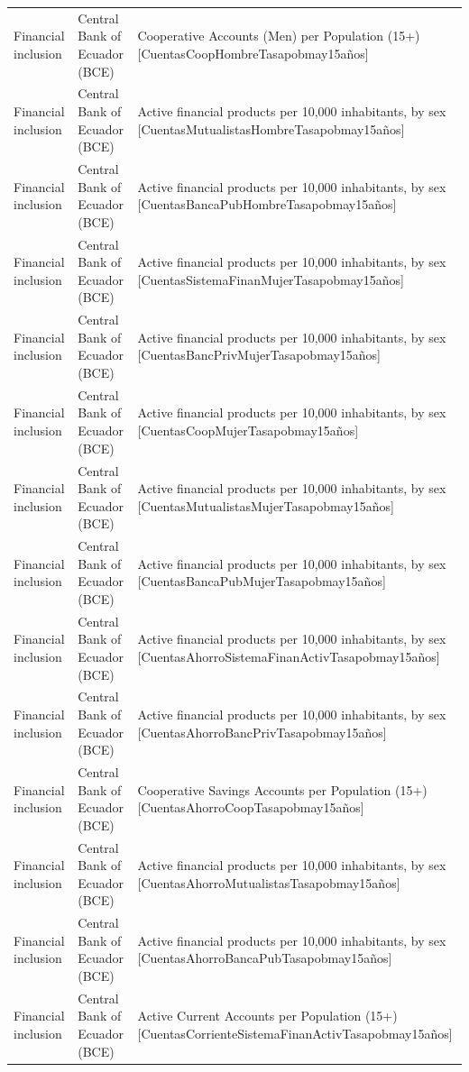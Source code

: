 \documentclass[10pt,a4paper]{article}
\begin{document}
\begin{longtable}{@{}>{\raggedright\arraybackslash}p{3.5cm}>{\raggedright\arraybackslash}p{5.6cm}>{\raggedright\arraybackslash}p{\dimexpr\textwidth-9.1cm-4\tabcolsep\relax}@{}}
Financial inclusion & Central Bank of Ecuador (BCE) & Cooperative Accounts (Men) per Population (15+) [CuentasCoopHombreTasapobmay15a\~{n}os]\\
Financial inclusion & Central Bank of Ecuador (BCE) & Active financial products per 10,000 inhabitants, by sex [CuentasMutualistasHombreTasapobmay15a\~{n}os]\\
Financial inclusion & Central Bank of Ecuador (BCE) & Active financial products per 10,000 inhabitants, by sex [CuentasBancaPubHombreTasapobmay15a\~{n}os]\\
Financial inclusion & Central Bank of Ecuador (BCE) & Active financial products per 10,000 inhabitants, by sex [CuentasSistemaFinanMujerTasapobmay15a\~{n}os]\\
Financial inclusion & Central Bank of Ecuador (BCE) & Active financial products per 10,000 inhabitants, by sex [CuentasBancPrivMujerTasapobmay15a\~{n}os]\\
Financial inclusion & Central Bank of Ecuador (BCE) & Active financial products per 10,000 inhabitants, by sex [CuentasCoopMujerTasapobmay15a\~{n}os]\\
Financial inclusion & Central Bank of Ecuador (BCE) & Active financial products per 10,000 inhabitants, by sex [CuentasMutualistasMujerTasapobmay15a\~{n}os]\\
Financial inclusion & Central Bank of Ecuador (BCE) & Active financial products per 10,000 inhabitants, by sex [CuentasBancaPubMujerTasapobmay15a\~{n}os]\\
Financial inclusion & Central Bank of Ecuador (BCE) & Active financial products per 10,000 inhabitants, by sex [CuentasAhorroSistemaFinanActivTasapobmay15a\~{n}os]\\
Financial inclusion & Central Bank of Ecuador (BCE) & Active financial products per 10,000 inhabitants, by sex [CuentasAhorroBancPrivTasapobmay15a\~{n}os]\\
Financial inclusion & Central Bank of Ecuador (BCE) & Cooperative Savings Accounts per Population (15+) [CuentasAhorroCoopTasapobmay15a\~{n}os]\\
Financial inclusion & Central Bank of Ecuador (BCE) & Active financial products per 10,000 inhabitants, by sex [CuentasAhorroMutualistasTasapobmay15a\~{n}os]\\
Financial inclusion & Central Bank of Ecuador (BCE) & Active financial products per 10,000 inhabitants, by sex [CuentasAhorroBancaPubTasapobmay15a\~{n}os]\\
Financial inclusion & Central Bank of Ecuador (BCE) & Active Current Accounts per Population (15+) [CuentasCorrienteSistemaFinanActivTasapobmay15a\~{n}os]\\

\end{longtable}
\end{document}

